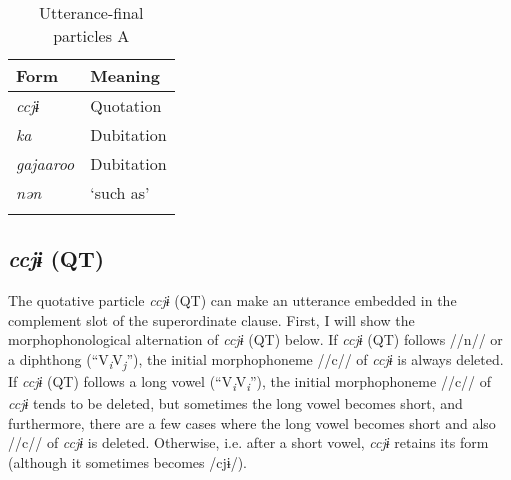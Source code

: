 \begin{table}
\caption{Utterance-final particles A\label{tab:100}}
\begin{tabular}{ll}
\lsptoprule
Form & Meaning\\\midrule
\textit{ccjɨ}     & Quotation \\
\textit{ka}       & Dubitation\\
\textit{gajaaroo} & Dubitation\\
\textit{nən}      & ‘such as’ \\
\lspbottomrule
\end{tabular}
\end{table}

\subsection{\textit{ccjɨ} (QT)}\label{sec:10.4.1}

The quotative particle \textit{ccjɨ} (QT) can make an utterance embedded in the complement slot of the superordinate clause. First, I will show the morphophonological alternation of \textit{ccjɨ} (QT) below. If \textit{ccjɨ} (QT) follows //n// or a diphthong (“V\textit{\textsubscript{i}}V\textit{\textsubscript{j}}”), the initial morphophoneme //c// of \textit{ccjɨ} is always deleted. If \textit{ccjɨ} (QT) follows a long vowel (“V\textit{\textsubscript{i}}V\textit{\textsubscript{i}}”), the initial morphophoneme //c// of \textit{ccjɨ} tends to be deleted, but sometimes the long vowel becomes short, and furthermore, there are a few cases where the long vowel becomes short and also //c// of \textit{ccjɨ} is deleted. Otherwise, i.e. after a short vowel, \textit{ccjɨ} retains its form (although it sometimes becomes /cjɨ/).

